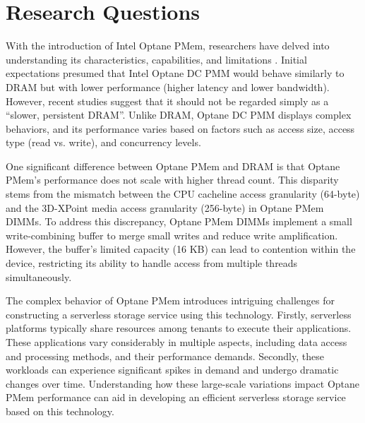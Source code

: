 
\section{Research Questions}

With the introduction of Intel Optane PMem, researchers have delved into understanding its characteristics, capabilities, and limitations \cite{izraelevitz2019basic, yang2020empirical, wu2020ribbon}. Initial expectations presumed that Intel Optane DC PMM would behave similarly to DRAM but with lower performance (higher latency and lower bandwidth). However, recent studies suggest that it should not be regarded simply as a “slower, persistent DRAM”. Unlike DRAM, Optane DC PMM displays complex behaviors, and its performance varies based on factors such as access size, access type (read vs. write), and concurrency levels.

One significant difference between Optane PMem and DRAM is that Optane PMem's performance does not scale with higher thread count. This disparity stems from the mismatch between the CPU cacheline access granularity (64-byte) and the 3D-XPoint media access granularity (256-byte) in Optane PMem DIMMs. To address this discrepancy, Optane PMem DIMMs implement a small write-combining buffer to merge small writes and reduce write amplification. However, the buffer’s limited capacity (16 KB) can lead to contention within the device, restricting its ability to handle access from multiple threads simultaneously.

The complex behavior of Optane PMem introduces intriguing challenges for constructing a serverless storage service using this technology. Firstly, serverless platforms typically share resources among tenants to execute their applications. These applications vary considerably in multiple aspects, including data access and processing methods, and their performance demands. Secondly, these workloads can experience significant spikes in demand and undergo dramatic changes over time. Understanding how these large-scale variations impact Optane PMem performance can aid in developing an efficient serverless storage service based on this technology.


